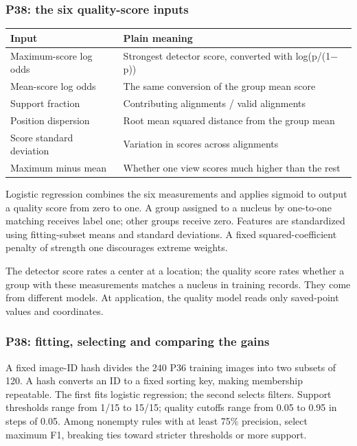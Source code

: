 \documentclass[
  12pt,
]{article}
\newcounter{none} %
\begin{document}
\subsubsection{P38: the six quality-score inputs}\label{chapter33}
{\def\LTcaptype{none}
\begin{longtable}[]{@{}
  >{\raggedright\arraybackslash}p{}
  >{\raggedright\arraybackslash}p{}@{}}
\toprule\noalign{}
Input & Plain meaning\\
\midrule\noalign{}
\endhead
\bottomrule\noalign{}
\endlastfoot
Maximum-score log odds & Strongest detector score, converted with log(p/(1\ensuremath{-}p))\\
Mean-score log odds & The same conversion of the group mean score\\
Support fraction & Contributing alignments / valid alignments\\
Position dispersion & Root mean squared distance from the group mean\\
Score standard deviation & Variation in scores across alignments\\
Maximum minus mean & Whether one view scores much higher than the rest\\
\end{longtable}}
Logistic regression combines the six measurements and applies sigmoid to output a quality score from zero to one. A group assigned to a nucleus by one-to-one matching receives label one; other groups receive zero. Features are standardized using fitting-subset means and standard deviations. A fixed squared-coefficient penalty of strength one discourages extreme weights.

The detector score rates a center at a location; the quality score rates whether a group with these measurements matches a nucleus in training records. They come from different models. At application, the quality model reads only saved-point values and coordinates.

\subsubsection{P38: fitting, selecting and comparing the gains}\label{chapter34}
A fixed image-ID hash divides the 240 P36 training images into two subsets of 120. A hash converts an ID to a fixed sorting key, making membership repeatable. The first fits logistic regression; the second selects filters. Support thresholds range from 1/15 to 15/15; quality cutoffs range from 0.05 to 0.95 in steps of 0.05. Among nonempty rules with at least 75\% precision, select maximum F1, breaking ties toward stricter thresholds or more support.
\end{document}
